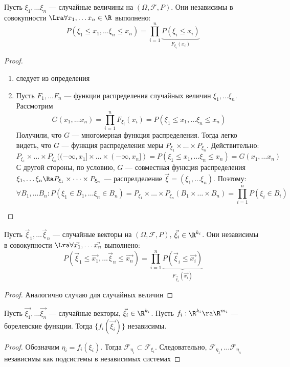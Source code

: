 \begin{theorem}
    Пусть \(\xi_1, \dots \xi_n\) --- случайные величины на \((\Omega, \mathcal{F}, P)\). Они независимы в совокупности \(\Lra \forall x_1, \dots x_n \in \R\) выполнено:
    \[P(\xi_1 \le x_1, \dots \xi_n \le x_n) = \prod_{i = 1}^n \underbrace{P(\xi_i \le x_i)}_{F_{\xi_i}(x_i)}\]
\end{theorem}
\begin{proof}
    \begin{enumerate}
        \item[\(\Ra\)] следует из определения
        \item[\(\La\)] Пусть \(F_1, \dots F_n\) --- функции распределения случайных величин \(\xi_1, \dots \xi_n\). Рассмотрим
        \[G(x_1, \dots x_n) = \prod_{i = 1}^n F_{\xi_i}(x_i) = P(\xi_1 \le x_1, \dots \xi_n \le x_n)\]
        Получили, что \(G\) --- многомерная функция распределения. Тогда легко видеть, что \(G\) --- функция распределения меры \(P_{\xi_1}\times \dots \times P_{\xi_n}\). Действительно:
        \[P_{\xi_1}\times \dots \times P_{\xi_n}((-\infty, x_1] \times \dots \times (-\infty, x_n]) = P(\xi_1 \le x_1, \dots \xi_n \le x_n) = G(x_1, \dots x_n)\]
        С другой стороны, по условию, \(G\) --- совместная функция распределения \(\xi_1, \dots \xi_n \Ra P_{\xi_1}\times \dots \times P_{\xi_n}\) --- распрелделение \(\vec{\xi} = (\xi_1, \dots \xi_n)\). Поэтому:
        \[\forall B_1, \dots B_n: P(\xi_1 \in B_1, \dots \xi_n \in B_n) = P_{\xi_1}\times \dots \times P_{\xi_n}(B_1 \times \dots \times B_n) = \prod_{i = 1}^n P(\xi_i \in B_i)\]
    \end{enumerate}
\end{proof}


\begin{theorem}
    Пусть \(\vec{\xi}_1, \dots \vec{\xi}_n\) --- случайные векторы на \((\Omega, \mathcal{F}, P)\), \(\vec{\xi_i} \in \R^{k_i}\). Они независимы в совокупности \(\Lra \forall \vec{x_1}, \dots \vec{x_n}\) выполнено:
    \[P(\vec{\xi}_1 \le \vec{x_1}, \dots \vec{\xi}_n \le \vec{x_n}) = \prod_{i = 1}^n \underbrace{P(\vec{\xi}_i \le \vec{x_i})}_{F_{\vec{\xi}_i}(\vec{x_i})}\]
\end{theorem}
\begin{proof}
    Аналогично случаю для случайных величин
\end{proof}

\begin{lemma}
    Пусть \(\vec{\xi_1}, \dots \vec{\xi_n}\) --- случайные векторы, \(\vec{\xi_i} \in \R^{k_i}\). Пусть \(f_i: \R^{k_i} \ra \R^{m_i}\) --- борелевские функции. Тогда \(\{f_i(\vec{\xi_i})\}\) независимы.
\end{lemma}
\begin{proof}
    Обозначим \(\eta_i = f_i(\xi_i)\). Тогда \(\mathcal{F}_{\eta_i} \subset \mathcal{F}_{\xi_i}\). Следовательно, \(\mathcal{F}_{\eta_1}, \dots \mathcal{F}_{\eta_n}\) независимы как подсистемы в независимых системах
\end{proof}

